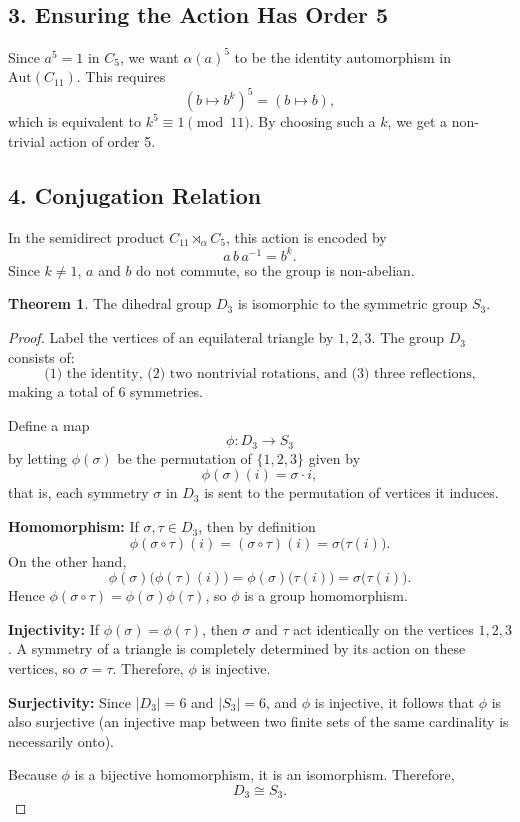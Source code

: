 \documentclass[12pt]{article}
\theoremstyle{definition} %
\newtheorem{theorem}{Theorem}
\theoremstyle{plain} %
\begin{document}
\subsection*{3. Ensuring the Action Has Order 5}
Since \(a^5 = 1\) in \(C_5\), we want \(\alpha(a)^5\) to be the identity automorphism in 
\(\mathrm{Aut}(C_{11})\). This requires 
\[
(b \mapsto b^k)^5 = (b \mapsto b),
\]
which is equivalent to \(k^5 \equiv 1 \pmod{11}\). 
By choosing such a \(k\), we get a non-trivial action of order 5.

\subsection*{4. Conjugation Relation}
In the semidirect product \(C_{11} \rtimes_\alpha C_{5}\), this action is encoded by 
\[
a\,b\,a^{-1} = b^k.
\]
Since \(k \neq 1\), \(a\) and \(b\) do not commute, so the group is non-abelian.

\begin{theorem}
    The dihedral group $D_3$ is isomorphic to the symmetric group $S_3$.
    \end{theorem}
    
    \begin{proof}
    Label the vertices of an equilateral triangle by $1, 2, 3$. The group $D_3$ consists of:
    \[
    \text{(1) the identity, (2) two nontrivial rotations, and (3) three reflections,}
    \]
    making a total of 6 symmetries.
    
    Define a map
    \[
    \phi: D_3 \longrightarrow S_3
    \]
    by letting $\phi(\sigma)$ be the permutation of $\{1,2,3\}$ given by
    \[
    \phi(\sigma)(i) = \sigma \cdot i,
    \]
    that is, each symmetry $\sigma$ in $D_3$ is sent to the permutation of vertices it induces.
    
    \textbf{Homomorphism:}
    If $\sigma, \tau \in D_3$, then by definition
    \[
    \phi(\sigma \circ \tau)(i) = (\sigma \circ \tau)(i) = \sigma\bigl(\tau(i)\bigr).
    \]
    On the other hand,
    \[
    \phi(\sigma)\bigl(\phi(\tau)(i)\bigr)
    = \phi(\sigma)\bigl(\tau(i)\bigr)
    = \sigma\bigl(\tau(i)\bigr).
    \]
    Hence $\phi(\sigma \circ \tau) = \phi(\sigma)\phi(\tau)$, so $\phi$ is a group homomorphism.
    
    \textbf{Injectivity:}
    If $\phi(\sigma) = \phi(\tau)$, then $\sigma$ and $\tau$ act identically on the vertices $1, 2, 3$. A symmetry of a triangle is completely determined by its action on these vertices, so $\sigma = \tau$. Therefore, $\phi$ is injective.
    
    \textbf{Surjectivity:}
    Since $|D_3| = 6$ and $|S_3| = 6$, and $\phi$ is injective, it follows that $\phi$ is also surjective (an injective map between two finite sets of the same cardinality is necessarily onto).
    
    Because $\phi$ is a bijective homomorphism, it is an isomorphism. Therefore,
    \[
    D_3 \cong S_3.
    \]
    \end{proof}
\end{document}
